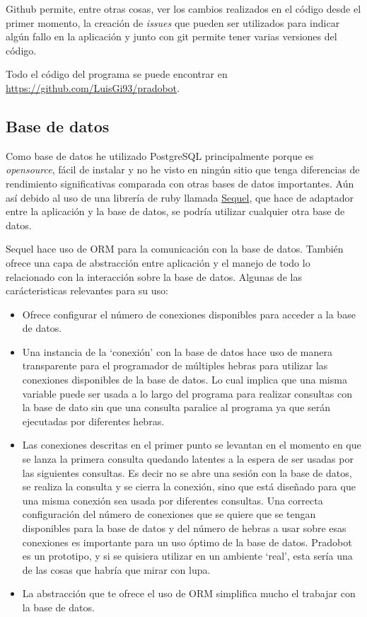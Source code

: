   Github permite, entre otras cosas, ver los cambios realizados en el código desde el primer momento, la creación de \textit{issues} que pueden ser utilizados para indicar algún fallo en la aplicación y junto con git permite tener varias versiones del código.
  
 Todo el código del programa se puede encontrar en \url{https://github.com/LuisGi93/pradobot}.


\subsection{Base de datos}

Como base de datos he utilizado PostgreSQL principalmente porque es \textit{opensource}, fácil de instalar y no he visto en ningún sitio que tenga diferencias de rendimiento significativas comparada con otras bases de datos importantes. Aún así debido al uso de una librería de ruby llamada \href{https://github.com/jeremyevans/sequel}{Sequel}, que hace de adaptador entre la aplicación y la base de datos, se podría utilizar cualquier otra base de datos.

Sequel hace uso de ORM para la comunicación con la base de datos. También ofrece una capa de  abstracción entre aplicación y el manejo de todo lo relacionado con la interacción sobre la base de datos. Algunas de las carácteristicas relevantes para su uso:

\begin{itemize}
\item Ofrece configurar el número de conexiones disponibles para acceder a la base de datos.\cite{sequel1}
\item Una instancia de la \enquote*{conexión} con la base de datos hace uso de manera transparente para el programador de múltiples hebras para utilizar las conexiones disponibles de la base de datos. Lo cual implica que una misma variable  puede ser usada a lo largo del programa para realizar consultas con la base de dato sin que una consulta paralice al programa ya que serán ejecutadas por diferentes hebras.
\item Las conexiones descritas en el primer punto se levantan en el momento en que se lanza la primera consulta \cite{sequel2} quedando latentes a la espera de ser usadas por las siguientes consultas. Es decir no se abre una sesión con la base de datos, se realiza la consulta y se cierra la conexión, sino que está diseñado para que una misma conexión sea usada por diferentes consultas. Una correcta configuración del número de conexiones que se quiere que se tengan disponibles para la base de datos y del número de hebras a usar sobre esas conexiones es importante para un uso óptimo de la base de datos. Pradobot es un prototipo, y si se quisiera utilizar en un ambiente \enquote*{real}, esta sería una de las cosas que habría que mirar con lupa.
\item La abstracción que te ofrece el uso de ORM simplifica mucho el trabajar con la base de datos.
\end{itemize}

